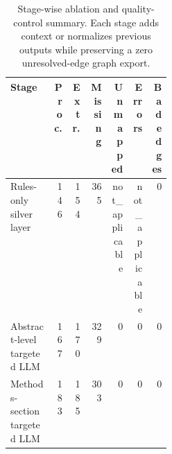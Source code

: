 \begin{table}[t]
\centering
\small
\caption{Stage-wise ablation and quality-control summary. Each stage adds context or normalizes previous outputs while preserving a zero unresolved-edge graph export.}
\label{tab:stagewise_qc}
\begin{tabular}{p{0.27\linewidth}rrrrrr}
\toprule
Stage & Proc. & Extr. & Missing & Unmapped & Errors & Bad edges \\
\midrule
Rules-only silver layer & 146 & 154 & 365 & not_applicable & not_applicable & 0 \\
Abstract-level targeted LLM & 167 & 170 & 329 & 0 & 0 & 0 \\
Methods-section targeted LLM & 183 & 185 & 303 & 0 & 0 & 0 \\
\bottomrule
\end{tabular}
\end{table}
